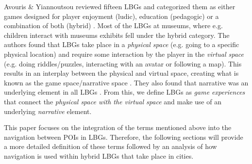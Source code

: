 

Avouris \& Yiannoutsou reviewed fifteen LBGs and categorized them as either games designed for player enjoyment (ludic), education (pedagogic) or a combination of both (hybrid) \cite{LBG_Review}. Most of the LBGs at museums, where e.g. children interact with museums exhibits fell under the hybrid category. The authors found that LBGs take place in a \textit{physical space} (e.g. going to a specific physical location) and require some interaction by the player in the \textit{virtual space} (e.g. doing riddles/puzzles, interacting with an avatar or following a map). This results in an interplay between the physical and virtual space, creating what is known as the game space/narrative space \cite{LBG_Review}. They also found that narrative was an underlying element in all LBGs \cite{LBG_Review}. From this, we define LBGs as \textit{game experiences} that connect the \textit{physical space with the virtual space} and make use of an underlying \textit{narrative} element.

This paper focuses on the integration of the terms mentioned above into the navigation between POIs in LBGs. Therefore, the following sections will provide a more detailed definition of these terms followed by an analysis of how navigation is used within hybrid LBGs that take place in cities.